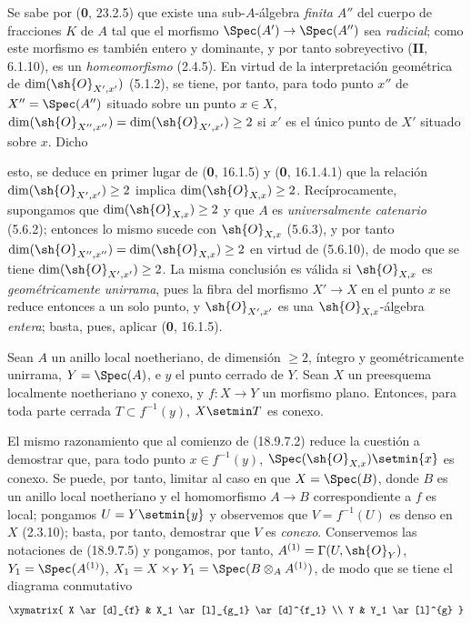 \begin{remark}[18.9.7.6]
\label{IV.18.9.7.6}
Se sabe por (\textbf 0, 23.2.5) que existe una sub-$A$-álgebra \emph{finita} $A''$ del cuerpo de fracciones $K$ de $A$ tal que el morfismo $\Spec(A')\to\Spec(A'')$ sea \emph{radicial}; como este morfismo es también entero y dominante, y por tanto sobreyectivo (\textbf{II}, 6.1.10), es un \emph{homeomorfismo} (2.4.5). En virtud de la interpretación geométrica de $\dim(\sh{O}_{X',x'})$ (5.1.2), se tiene, por tanto, para todo punto $x''$ de $X''=\Spec(A'')$ situado sobre un punto $x\in X$, $\dim(\sh{O}_{X'',x''})=\dim(\sh{O}_{X',x'})\geq 2$ si $x'$ es el único punto de $X'$ situado sobre $x$. Dicho


esto, se deduce en primer lugar de (\textbf 0, 16.1.5) y (\textbf 0, 16.1.4.1) que la relación $\dim(\sh{O}_{X',x'})\geq 2$ implica $\dim(\sh{O}_{X,x})\geq 2$. Recíprocamente, supongamos que $\dim(\sh{O}_{X,x})\geq 2$ y que $A$ es \emph{universalmente catenario} (5.6.2); entonces lo mismo sucede con $\sh{O}_{X,x}$ (5.6.3), y por tanto $\dim(\sh{O}_{X'',x''})=\dim(\sh{O}_{X,x})\geq 2$ en virtud de (5.6.10), de modo que se tiene $\dim(\sh{O}_{X',x'})\geq 2$. La misma conclusión es válida si $\sh{O}_{X,x}$ es \emph{geométricamente unirrama}, pues la fibra del morfismo $X'\to X$ en el punto $x$ se reduce entonces a un solo punto, y $\sh{O}_{X',x'}$ es una $\sh{O}_{X,x}$-álgebra \emph{entera}; basta, pues, aplicar (\textbf 0, 16.1.5).
\end{remark}

\begin{lemma}[18.9.7.7]
\label{IV.18.9.7.7}
Sean $A$ un anillo local noetheriano, de dimensión $\geq 2$, íntegro y geométricamente unirrama, $Y=\Spec(A)$, e $y$ el punto cerrado de $Y$. Sean $X$ un preesquema localmente noetheriano y conexo, y $f:X\to Y$ un morfismo plano. Entonces, para toda parte cerrada $T\subset f^{-1}(y)$, $X\setmin T$ es conexo.
\end{lemma}

El mismo razonamiento que al comienzo de (18.9.7.2) reduce la cuestión a demostrar que, para todo punto $x\in f^{-1}(y)$, $\Spec(\sh{O}_{X,x})\setmin\{x\}$ es conexo. Se puede, por tanto, limitar al caso en que $X=\Spec(B)$, donde $B$ es un anillo local noetheriano y el homomorfismo $A\to B$ correspondiente a $f$ es local; pongamos $U=Y\setmin\{y\}$ y observemos que $V=f^{-1}(U)$ es denso en $X$ (2.3.10); basta, por tanto, demostrar que $V$ es \emph{conexo}. Conservemos las notaciones de (18.9.7.5) y pongamos, por tanto, $A^{(1)}=\Gamma(U,\sh{O}_Y)$, $Y_1=\Spec(A^{(1)})$, $X_1=X\times_Y Y_1=\Spec(B\otimes_A A^{(1)})$, de modo que se tiene el diagrama conmutativo
\[
  \xymatrix{
    X \ar[d]_{f} & X_1 \ar[l]_{g_1} \ar[d]^{f_1} \\
    Y & Y_1 \ar[l]^{g}
  }
\]

